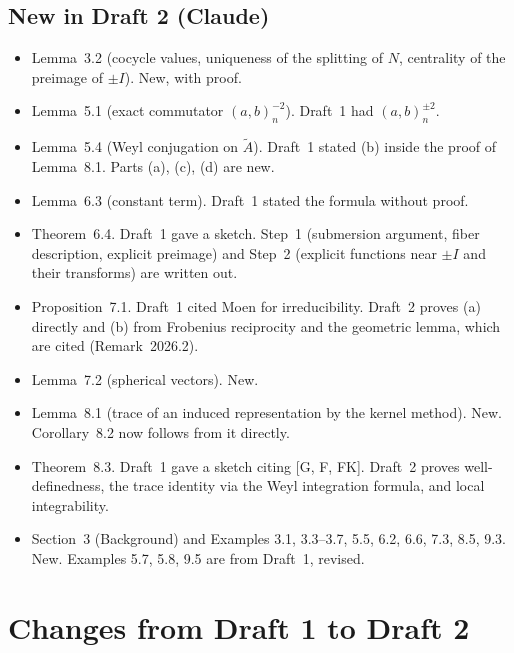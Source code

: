 \documentclass[12pt,letterpaper]{article}
\newcommand{\At}{\widetilde A}
\begin{document}
\subsection{New in Draft 2 (Claude)}
\begin{itemize}[leftmargin=*]
\item Lemma~3.2 (cocycle values, uniqueness of the splitting of $N$,
  centrality of the preimage of $\pm I$). New, with proof.
\item Lemma~5.1 (exact commutator $(a,b)_n^{-2}$). Draft~1 had
  $(a,b)_n^{\pm2}$.
\item Lemma~5.4 (Weyl conjugation on $\At$). Draft~1 stated (b) inside
  the proof of Lemma~8.1. Parts (a), (c), (d) are new.
\item Lemma~6.3 (constant term). Draft~1 stated the formula without
  proof.
\item Theorem~6.4. Draft~1 gave a sketch. Step~1 (submersion argument,
  fiber description, explicit preimage) and Step~2 (explicit functions
  near $\pm I$ and their transforms) are written out.
\item Proposition~7.1. Draft~1 cited Moen for irreducibility. Draft~2
  proves (a) directly and (b) from Frobenius reciprocity and the
  geometric lemma, which are cited (Remark~2026.2).
\item Lemma~7.2 (spherical vectors). New.
\item Lemma~8.1 (trace of an induced representation by the kernel
  method). New. Corollary~8.2 now follows from it directly.
\item Theorem~8.3. Draft~1 gave a sketch citing [G, F, FK]. Draft~2
  proves well-definedness, the trace identity via the Weyl integration
  formula, and local integrability.
\item Section~3 (Background) and Examples 3.1, 3.3--3.7, 5.5, 6.2, 6.6,
  7.3, 8.5, 9.3. New. Examples 5.7, 5.8, 9.5 are from Draft~1, revised.
\end{itemize}

\section{Changes from Draft 1 to Draft 2}
\end{document}
